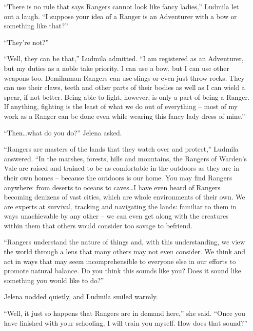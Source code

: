  

“There is no rule that says Rangers cannot look like fancy ladies,” Ludmila let out a laugh. “I suppose your idea of a Ranger is an Adventurer with a bow or something like that?”

 

“They’re not?”

 

“Well, they can be that,” Ludmila admitted. “I am registered as an Adventurer, but my duties as a noble take priority. I can use a bow, but I can use other weapons too. Demihuman Rangers can use slings or even just throw rocks. They can use their claws, teeth and other parts of their bodies as well as I can wield a spear, if not better. Being able to fight, however, is only a part of being a Ranger. If anything, fighting is the least of what we do out of everything – most of my work as a Ranger can be done even while wearing this fancy lady dress of mine.”

 

“Then…what do you do?” Jelena asked.

 

“Rangers are masters of the lands that they watch over and protect,” Ludmila answered. “In the marshes, forests, hills and mountains, the Rangers of Warden’s Vale are raised and trained to be as comfortable in the outdoors as they are in their own homes – because the outdoors is our home. You may find Rangers anywhere: from deserts to oceans to caves…I have even heard of Rangers becoming denizens of vast cities, which are whole environments of their own. We are experts at survival, tracking and navigating the lands: familiar to them in ways unachievable by any other – we can even get along with the creatures within them that others would consider too savage to befriend.

 

“Rangers understand the nature of things and, with this understanding, we view the world through a lens that many others may not even consider. We think and act in ways that may seem incomprehensible to everyone else in our efforts to promote natural balance. Do you think this sounds like you? Does it sound like something you would like to do?”

 

Jelena nodded quietly, and Ludmila smiled warmly.

 

“Well, it just so happens that Rangers are in demand here,” she said. “Once you have finished with your schooling, I will train you myself. How does that sound?”

